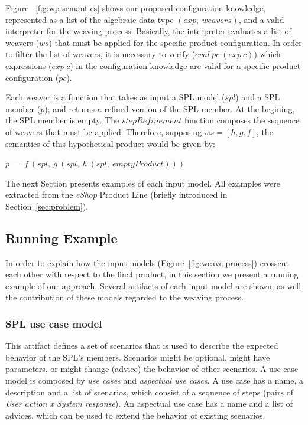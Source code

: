 Figure ~\ref{fig:wp-semantics} shows our proposed configuration knowledge,
represented as a list of the algebraic data type $(exp,\ weavers)$, and a valid
interpreter for the weaving process. Basically,
the interpreter evaluates a list of weavers ($ws$) that must be applied for
the specific product configuration. In order to filter the list of weavers, it
is necessary to verify  ($eval\ pc\ (exp\ c)$) which expressions ($exp\ c$) in
the configuration knowledge are valid for a specific product configuration
($pc$).

Each weaver is a function that takes as input a SPL model
($spl$) and a SPL member ($p$); and returns a refined
version of the SPL member. At the begining, the SPL member is empty.
The $stepRefinement$ function composes the sequence of weavers that must
be applied. Therefore, supposing $ws = [h,g,f]$, the semantics of
this hypothetical product would be given by:

\begin{center}
$ p\ =\ f\ (spl,\ g\ (spl,\ h\ (spl,\ emptyProduct)))  $
\end{center}

The next Section presents examples of each input model. All examples were
extracted from the \emph{eShop} Product Line (briefly introduced in
Section~\ref{sec:problem}).


\subsection{Running Example}
\label{sub:running}

In order to explain how the input models (Figure~\ref{fig:weave-process})
crosscut each other with respect to the final product, in this section we
present a running example of our approach. Several artifacts of each input model
are shown; as well the contribution of these models regarded to the weaving
process.


\subsubsection{SPL use case model}

This artifact defines a set of scenarios that is used to describe the expected
behavior of the SPL's members. Scenarios might be optional, might have
parameters, or might change (advice) the behavior of other scenarios. A use case model is
composed by \emph{use cases} and \emph{aspectual use cases}. A use case has a
name, a description and a list of scenarios, which consist of a sequence of
steps (pairs of \emph{User action x System response}). An aspectual use case has a name and a list of advices, which can be
used to extend the behavior of existing scenarios.

